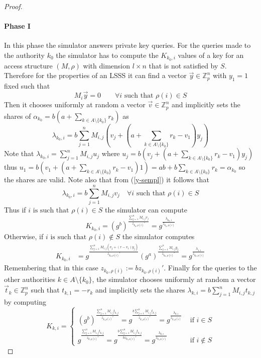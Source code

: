 \begin{proof}
    \paragraph*{Phase I}
      In this phase the simulator answers private key queries.
      For the queries made to the authority $k_0$ the simulator has to compute the $K_{k_0,i}$ values of a key for an access structure $(M,\rho)$ with dimension $l \times n$ that is not satisfied by $S$.
      Therefore for the properties of an LSSS it can find a vector $\vec{y} \in \mathbb{Z}_p^n$ with $y_1 = 1$ fixed such that
      \begin{equation}\label{y-sempl}
        M_i \vec{y} = 0 \qquad \forall i \mbox{ such that } \rho(i) \in S
      \end{equation}
      Then it chooses uniformly at random a vector $\vec{v} \in \mathbb{Z}_p^n$ and implicitly sets the shares of $\alpha_{k_0} = b(a+ \sum_{k \in A \setminus \{k_0\}} r_k)$ as
      $$
        \lambda_{k_0,i} = b \sum_{j=1}^n M_{i,j} (v_j + (a + \sum_{k \in A \setminus \{k_0\}} r_k - v_1)y_j)
      $$
      Note that $\lambda_{k_0,i} = \sum_{j=1}^n M_{i,j} u_j$ where $u_j = b (v_j + (a + \sum_{k \in A \setminus \{k_0\}} r_k - v_1)y_j)$ thus \linebreak[4] ${u_1 = b (v_1 + (a + \sum_{k \in A \setminus \{k_0\}} r_k - v_1) 1) = ab + b \sum_{k \in A \setminus \{k_0\}} r_k= \alpha_{k_0} }$ so the shares are valid.
      Note also that from (\ref{y-sempl}) it follows that
      $$
        \lambda_{k_0,i} = b \sum_{j=1}^n M_{i,j}v_j \quad \forall i \mbox{ such that } \rho(i) \in S
      $$
      Thus if $i \mbox{ is such that } \rho(i) \in S$ the simulator can compute
      $$
        K_{k_0,i} = (g^b)^{\frac{\sum_{j=1}^n M_{i,j}v_j}{z_{k_0,\rho(i)}'}} = g^{\frac{\lambda_{k_0,i}}{z_{k_0, \rho(i)}}}
      $$
Otherwise, if $i \mbox{ is such that } \rho(i) \notin S$ the simulator computes
      \begin{align*}
        K_{k_0,i} &= g^{\frac{\sum_{j=1}^n M_{i,j}(v_j +(r - v_1)y_j)}{z_{k_0,\rho(i)}'}} (g^a)^{\frac{\sum_{j=1}^n M_{i,j}y_j}{z_{k_0,\rho(i)}'}}  = g^{\frac{\lambda_{1,i}}{z_{k_0, \rho(i)}}}
      \end{align*}
      Remembering that in this case $z_{k_0, \rho(i)} := b z_{k_0, \rho(i)}'$.
      Finally for the queries to the other authorities $k \in A \setminus \{k_0\}$, the simulator chooses uniformly at random a vector $\vec{t}_k \in \mathbb{Z}_p^n$ such that $t_{k, 1} = -r_k$ and implicitly sets the shares $\lambda_{k,i} = b \sum_{j=1}^n M_{i,j} t_{k,j}$ by computing
      $$
        K_{k,i} =
        \begin{cases}
          (g^b)^{\frac{\sum_{j=1}^n M_{i,j} t_{k,j}}{z_{k, \rho(i)}'}} = g^{\frac{b \sum_{j=1}^n M_{i,j} t_{k,j}}{z_{k, \rho(i)}'}} = g^{\frac{\lambda_{k,i}}{z_{k, \rho(i)}}} &\text{ if } i \in S \\
          g^{\frac{\sum_{j=1}^n M_{i,j} t_{k,j}}{z_{k, \rho(i)}'}} = g^{\frac{b \sum_{j=1}^n M_{i,j} t_{k,j}}{b z_{k, \rho(i)}'}} = g^{\frac{\lambda_{k,i}}{z_{k, \rho(i)}}} &\text{ if } i \notin S
        \end{cases}
      $$


\end{proof}
